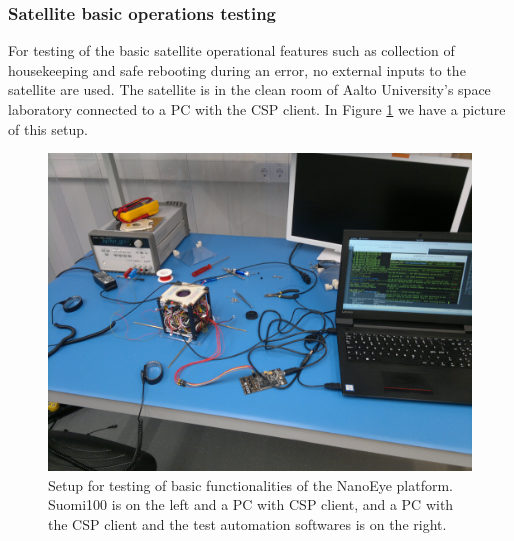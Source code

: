 \documentclass[english,12pt,a4paper,pdftex,elec,utf8]{aaltothesis}
\begin{document}
\subsubsection{Satellite basic operations testing}
For testing of the basic satellite operational features such as collection of housekeeping and safe rebooting during an error, no external inputs to the satellite are used. The satellite is in the clean room of Aalto University's space laboratory connected to a PC with the CSP client. 
In Figure \ref{basictest} we have a picture of this setup.
\begin{figure}[h!]
\centering
\includegraphics[scale=0.3]{basicsetup}
\caption{Setup for testing of basic functionalities of the NanoEye platform. Suomi100 is on the left and a PC with CSP client, and a PC with the CSP client and the test automation softwares is on the right.}
\label{basictest}
\end{figure}  
\end{document}

